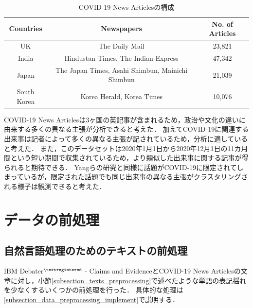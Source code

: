 \documentclass[12pt,a4j]{jreport}
\begin{document}
\begin{table}[H]
  \caption{COVID-19 News Articlesの構成}
  \centering
  \vspace{4mm}
  \begin{tabular}{ccc}
    \hline
    Countries & Newspapers & No. of Articles \\
    \hline
    UK & The Daily Mail & 23,821 \\
    India & Hindustan Times, The Indian Express & 47,342 \\
    Japan & The Japan Times, Asahi Shimbun, Mainichi Shimbun & 21,039 \\
    South Korea & Korea Herald, Korea Times & 10,076 \\
    \hline
    \end{tabular}
  \label{covid_19_news_articles_composition}
\end{table}

COVID-19 News Articlesは3ヶ国の英記事が含まれるため，政治や文化の違いに由来する多くの異なる主張が分析できると考えた．
加えてCOVID-19に関連する出来事は記者によって多くの異なる主張が記されているため，分析に適していると考えた．
また，このデータセットは2020年1月1日から2020年12月1日の11カ月間という短い期間で収集されているため，より類似した出来事に関する記事が得られると期待できる．
Yangらの研究と同様に話題がCOVID-19に限定されてしまっているが，限定された話題でも同じ出来事の異なる主張がクラスタリングされる様子は観測できると考えた．

\section{データの前処理}
\label{section_preprocessing_data}

\subsection{自然言語処理のためのテキストの前処理}
IBM Debater$^{\textregistered}$ - Claims and EvidenceとCOVID-19 News Articlesの文章に対し，小節\ref{subsection_texts_preprocessing}で述べたような単語の表記揺れを少なくするいくつかの前処理を行った．
具体的な処理は\ref{subsection_data_preprocessing_implement}で説明する．

\end{document}
